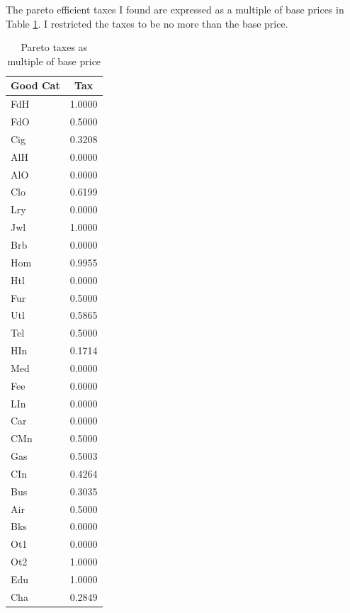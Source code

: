 \documentclass[12pt]{article}
\begin{document}
The pareto efficient taxes I found are expressed as a multiple of base prices in Table \ref{tab:opttax}. I restricted the taxes to be no more than the base price.
\begin{table}
    \centering
	\begin{tabular}{|l|c|}
	    \hline
	    \textbf{Good Cat} & \textbf{Tax} \\
	    \hline
	    FdH &  1.0000\\
	    \hline
	    FdO &  0.5000\\ 
	    \hline
	    Cig &  0.3208\\ 
	    \hline
	    AlH &  0.0000\\ 
	    \hline
	    AlO &  0.0000\\ 
	    \hline
	    Clo &  0.6199\\ 
	    \hline
	    Lry &  0.0000\\ 
	    \hline
	    Jwl &  1.0000\\ 
	    \hline
	    Brb &  0.0000\\ 
	    \hline
	    Hom &  0.9955\\ 
	    \hline
	    Htl &  0.0000\\ 
	    \hline
	    Fur &  0.5000\\ 
	    \hline
	    Utl &  0.5865\\ 
	    \hline
	    Tel &  0.5000\\ 
	    \hline
	    HIn &  0.1714\\ 
	    \hline
	    Med &  0.0000\\ 
	    \hline
	    Fee &  0.0000\\ 
	    \hline
	    LIn &  0.0000\\ 
	    \hline
	    Car &  0.0000\\ 
	    \hline
	    CMn &  0.5000\\ 
	    \hline
	    Gas &  0.5003\\ 
	    \hline
	    CIn &  0.4264\\ 
	    \hline
	    Bus &  0.3035\\ 
	    \hline
	    Air &  0.5000\\ 
	    \hline
	    Bks &  0.0000\\ 
	    \hline
	    Ot1 &  0.0000\\ 
	    \hline
	    Ot2 &  1.0000\\ 
	    \hline
	    Edu &  1.0000\\ 
	    \hline
	    Cha &  0.2849\\ 
	    \hline
	\end{tabular}
    \caption{Pareto taxes as multiple of base price}
    \label{tab:opttax}
\end{table}
\end{document}
